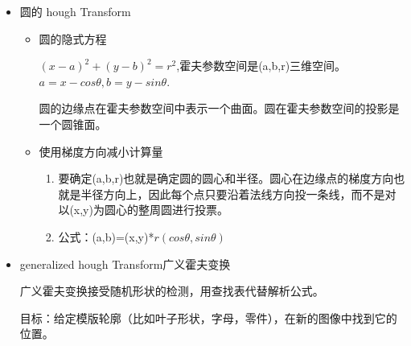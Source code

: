 \documentclass[UTF8]{ctexart}
\begin{document}
\begin{itemize}
\begin{itemize}
        图像空间的每一个点，我们不知道它属于霍夫空间的那一条线，因此我们要将$\theta$从0到180度遍历一遍，得到一条线，大大增加了计算成本。

        \item modified hough transform流程
        \begin{enumerate}
            \item 对于图像空间中每一个边缘点(x,y):
            \item 求在此点的梯度方向$\theta$
            \item $\rho=xcos\theta+ysin\theta$
            \item $H(\theta,\rho)=H(\theta,\rho)+1$
            \item end
        \end{enumerate}
    \end{itemize}

    \item 圆的 hough Transform
    
    \begin{itemize}
        \item 圆的隐式方程
        
        $(x-a)^2+(y-b)^2=r^2$,霍夫参数空间是(a,b,r)三维空间。$a=x-cos\theta,b=y-sin\theta$.

        圆的边缘点在霍夫参数空间中表示一个曲面。圆在霍夫参数空间的投影是一个圆锥面。

        \item 使用梯度方向减小计算量
        
        \begin{enumerate}
            \item 要确定(a,b,r)也就是确定圆的圆心和半径。圆心在边缘点的梯度方向也就是半径方向上，因此每个点只要沿着法线方向投一条线，而不是对以(x,y)为圆心的整周圆进行投票。
            \item 公式：(a,b)=(x,y)*$r(cos\theta,sin\theta)$
        \end{enumerate}
    \end{itemize}

    \item generalized hough Transform广义霍夫变换
    
    广义霍夫变换接受随机形状的检测，用查找表代替解析公式。

    目标：给定模版轮廓（比如叶子形状，字母，零件），在新的图像中找到它的位置。


\end{itemize}
\end{document}
